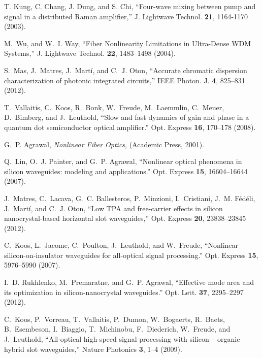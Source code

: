 \begin{thebibliography}{10}
T. Kung, C. Chang, J. Dung, and S. Chi, \enquote{{Four-wave mixing between pump and signal in a distributed
  Raman amplifier},}  J. Lightwave Technol. \textbf{21}, 1164-1170 (2003).


M.~Wu, and W.~I. Way, \enquote{{Fiber Nonlinearity Limitations in Ultra-Dense WDM Systems},} J. Lightwave Technol. \textbf{22}, 1483--1498 (2004).


S.~Mas, J.~Matres, J.~Mart\'i, and C.~J. Oton, \enquote{{Accurate chromatic
  dispersion characterization of photonic integrated circuits},} IEEE Photon. J. \textbf{4}, 825--831 (2012).


T.~Vallaitis, C.~Koos, R.~Bonk, W.~Freude, M.~Laemmlin, C.~Meuer, D.~Bimberg,
  and J.~Leuthold, \enquote{{Slow and fast dynamics of gain and phase in a
  quantum dot semiconductor optical amplifier.}} Opt. Express \textbf{16},
  170--178 (2008).

G.~P. Agrawal, \emph{{Nonlinear Fiber Optics}}, (Academic Press, 2001).

Q.~Lin, O.~J. Painter, and G.~P. Agrawal, \enquote{{Nonlinear optical phenomena
  in silicon waveguides: modeling and applications.}} Opt. Express
  \textbf{15}, 16604--16644 (2007).

J.~Matres, C.~Lacava, G.~C. Ballesteros, P.~Minzioni, I.~Cristiani, J.~M.
  F\'{e}d\'{e}li, J.~Mart\'i, and C.~J. Oton, \enquote{{Low TPA and
  free-carrier effects in silicon nanocrystal-based horizontal slot
  waveguides},} Opt. Express \textbf{20}, 23838--23845 (2012).

C.~Koos, L.~Jacome, C.~Poulton, J.~Leuthold, and W.~Freude, \enquote{{Nonlinear
  silicon-on-insulator waveguides for all-optical signal processing.}} Opt. Express \textbf{15}, 5976--5990 (2007).

I.~D. Rukhlenko, M.~Premaratne, and G.~P. Agrawal, \enquote{{Effective mode
  area and its optimization in silicon-nanocrystal waveguides.}} Opt. Lett.
  \textbf{37}, 2295--2297 (2012).

C.~Koos, P.~Vorreau, T.~Vallaitis, P.~Dumon, W.~Bogaerts, R.~Baets,
  B.~Esembeson, I.~Biaggio, T.~Michinobu, F.~Diederich, W.~Freude, and
  J.~Leuthold, \enquote{{All-optical high-speed signal processing with silicon
  – organic hybrid slot waveguides},} Nature Photonics \textbf{3}, 1--4
  (2009).

\end{thebibliography}
